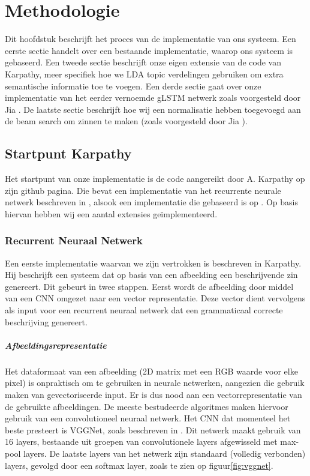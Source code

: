 \chapter{Methodologie}
Dit hoofdstuk beschrijft het proces van de implementatie van ons systeem. Een eerste sectie handelt over een bestaande implementatie, waarop ons systeem is gebaseerd. Een tweede sectie beschrijft onze eigen extensie van de code van Karpathy, meer specifiek hoe we LDA topic verdelingen gebruiken om extra semantische informatie toe te voegen. Een derde sectie gaat over onze implementatie van het eerder vernoemde gLSTM netwerk zoals voorgesteld door Jia . De laatste sectie beschrijft hoe wij een normalisatie hebben toegevoegd aan de beam search om zinnen te maken (zoals voorgesteld door Jia ).

\section{Startpunt Karpathy} 
Het startpunt van onze implementatie is de code aangereikt door A. Karpathy op zijn github pagina. Die bevat een implementatie van het recurrente neurale netwerk beschreven in , alsook een implementatie die gebaseerd is op . Op basis hiervan hebben wij een aantal extensies ge\"implementeerd.
\subsection{Recurrent Neuraal Netwerk}
Een eerste implementatie waarvan we zijn vertrokken is beschreven in Karpathy. Hij beschrijft een systeem dat op basis van een afbeelding een beschrijvende zin genereert. Dit gebeurt in twee stappen. Eerst wordt de afbeelding door middel van een CNN omgezet naar een vector representatie. Deze vector dient vervolgens als input voor een recurrent neuraal netwerk dat een grammaticaal correcte beschrijving genereert.

\paragraph{Afbeeldingsrepresentatie}
Het dataformaat van een afbeelding (2D matrix met een RGB waarde voor elke pixel) is onpraktisch om te gebruiken in neurale netwerken, aangezien die gebruik maken van gevectoriseerde input. Er is dus nood aan een vectorrepresentatie van de gebruikte afbeeldingen. De meeste bestudeerde algoritmes maken hiervoor gebruik van een convolutioneel neuraal netwerk. Het CNN dat momenteel het beste presteert is VGGNet, zoals beschreven in . Dit netwerk maakt gebruik van 16 layers, bestaande uit groepen van convolutionele layers afgewisseld met max-pool layers. De laatste layers van het netwerk zijn standaard (volledig verbonden) layers, gevolgd door een softmax layer, zoals te zien op figuur\ref{fig:vggnet}.


